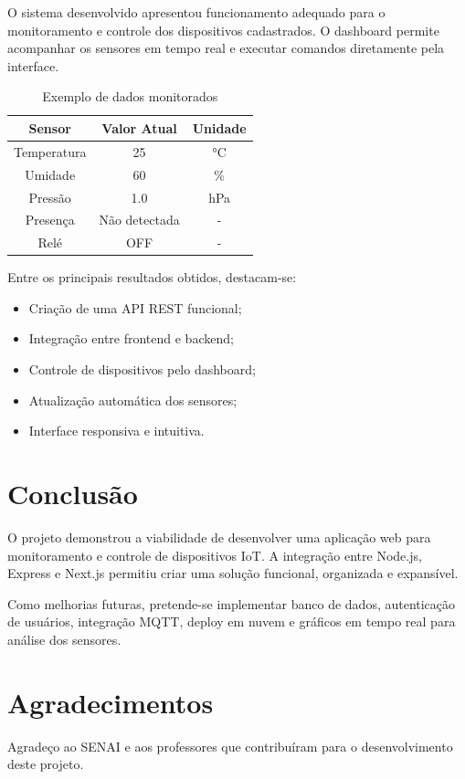 \documentclass[12pt]{unisenaiclass}
\begin{document}
O sistema desenvolvido apresentou funcionamento adequado para o monitoramento e controle dos dispositivos cadastrados. O dashboard permite acompanhar os sensores em tempo real e executar comandos diretamente pela interface.

\begin{table}[H]
    \centering
    \caption{Exemplo de dados monitorados}
    \begin{tabular}{|c|c|c|}
        \hline
        Sensor & Valor Atual & Unidade \\ \hline
        Temperatura & 25 & °C \\ \hline
        Umidade & 60 & \% \\ \hline
        Pressão & 1.0 & hPa \\ \hline
        Presença & Não detectada & - \\ \hline
        Relé & OFF & - \\ \hline
    \end{tabular}
\end{table}

Entre os principais resultados obtidos, destacam-se:

\begin{itemize}
    \item Criação de uma API REST funcional;
    \item Integração entre frontend e backend;
    \item Controle de dispositivos pelo dashboard;
    \item Atualização automática dos sensores;
    \item Interface responsiva e intuitiva.
\end{itemize}

\section{Conclusão}

O projeto demonstrou a viabilidade de desenvolver uma aplicação web para monitoramento e controle de dispositivos IoT. A integração entre Node.js, Express e Next.js permitiu criar uma solução funcional, organizada e expansível.

Como melhorias futuras, pretende-se implementar banco de dados, autenticação de usuários, integração MQTT, deploy em nuvem e gráficos em tempo real para análise dos sensores.

\section*{Agradecimentos}

Agradeço ao SENAI e aos professores que contribuíram para o desenvolvimento deste projeto.

\printbibliography
\end{document}
